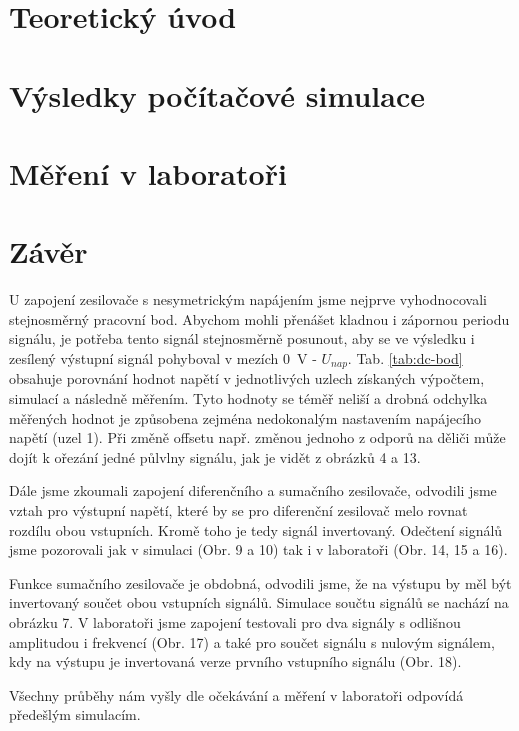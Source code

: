 \documentclass{protokol}
\begin{document}
	\maketitle

	\section{Teoretický úvod}
		
		
	\newpage
	\section{Výsledky počítačové simulace}
		
	\newpage
	\section{Měření v laboratoři}
		
		
		
	\clearpage
	\section{Závěr}
		U zapojení zesilovače s nesymetrickým napájením jsme nejprve vyhodnocovali stejnosměrný pracovní bod.
		Abychom mohli přenášet kladnou i zápornou periodu signálu, je potřeba tento signál stejnosměrně posunout, aby se ve výsledku i zesílený výstupní signál pohyboval v mezích \qty{0}{\volt} - \(U_{nap} \).
		Tab. \ref{tab:dc-bod} obsahuje porovnání hodnot napětí v jednotlivých uzlech získaných výpočtem, simulací a následně měřením. Tyto hodnoty se téměř neliší a drobná odchylka měřených hodnot je způsobena zejména nedokonalým nastavením napájecího napětí (uzel 1).
		Při změně offsetu např. změnou jednoho z odporů na děliči může dojít k ořezání jedné půlvlny signálu, jak je vidět z obrázků 4 a 13. 

		Dále jsme zkoumali zapojení diferenčního a sumačního zesilovače, odvodili jsme vztah pro výstupní napětí, které by se pro diferenční zesilovač melo rovnat rozdílu obou vstupních. Kromě toho je tedy signál invertovaný. 
		Odečtení signálů jsme pozorovali jak v simulaci (Obr. 9 a 10) tak i v laboratoři (Obr. 14, 15 a 16).

		Funkce sumačního zesilovače je obdobná, odvodili jsme, že na výstupu by měl být invertovaný součet obou vstupních signálů. Simulace součtu signálů se nachází na obrázku 7. V laboratoři jsme zapojení testovali pro dva signály s odlišnou amplitudou i frekvencí (Obr. 17) a také pro součet signálu s nulovým signálem, kdy na výstupu je invertovaná verze prvního vstupního signálu (Obr. 18).

		Všechny průběhy nám vyšly dle očekávání a měření v laboratoři odpovídá předešlým simulacím.
\end{document}
